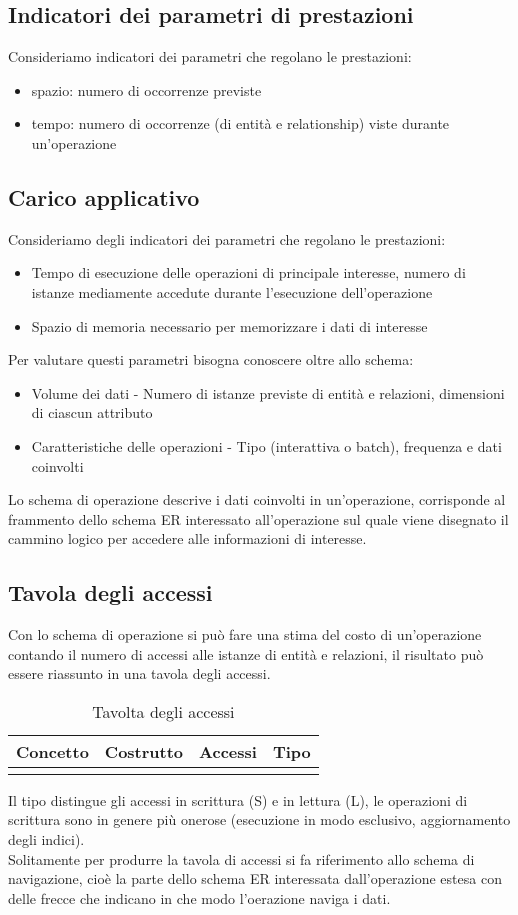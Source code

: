 \subsection*{Indicatori dei parametri di prestazioni}
Consideriamo indicatori dei parametri che regolano le prestazioni:
\begin{itemize}
    \item spazio: numero di occorrenze previste
    \item tempo: numero di occorrenze (di entità e relationship) viste durante un'operazione
\end{itemize}
\subsection{Carico applicativo}
Consideriamo degli indicatori dei parametri che regolano le prestazioni:
\begin{itemize}
    \item Tempo di esecuzione delle operazioni di principale interesse, numero di istanze mediamente
    accedute durante l'esecuzione dell'operazione
    \item Spazio di memoria necessario per memorizzare i dati di interesse
\end{itemize}
Per valutare questi parametri bisogna conoscere oltre allo schema:
\begin{itemize}
    \item Volume dei dati - Numero di istanze previste di entità e relazioni, dimensioni 
    di ciascun attributo
    \item Caratteristiche delle operazioni - Tipo (interattiva o batch), frequenza e dati coinvolti
\end{itemize}
Lo schema di operazione descrive i dati coinvolti in un'operazione, corrisponde al frammento dello
schema ER interessato all'operazione sul quale viene disegnato il cammino logico per accedere alle
informazioni di interesse.
\subsection{Tavola degli accessi}
Con lo schema di operazione si può fare una stima del costo di un'operazione contando
il numero di accessi alle istanze di entità e relazioni, il risultato può
essere riassunto in una tavola degli accessi.
\begin{table}[h]
    \centering
    \begin{tabular}{|c|c|c|c|}
      \hline
      Concetto & Costrutto & Accessi & Tipo \\
      \hline
      & & & \\
      \hline
    \end{tabular}
    \caption{Tavolta degli accessi}
    \label{tab:four-columns}
  \end{table}
  Il tipo distingue gli accessi in scrittura (S) e in lettura (L), le operazioni
  di scrittura sono in genere più onerose (esecuzione in modo esclusivo, aggiornamento degli
  indici).\\
  Solitamente per produrre la tavola di accessi si fa riferimento allo schema di navigazione, cioè
  la parte dello schema ER interessata dall'operazione estesa con delle frecce che indicano in che modo 
  l'oerazione naviga i dati.
